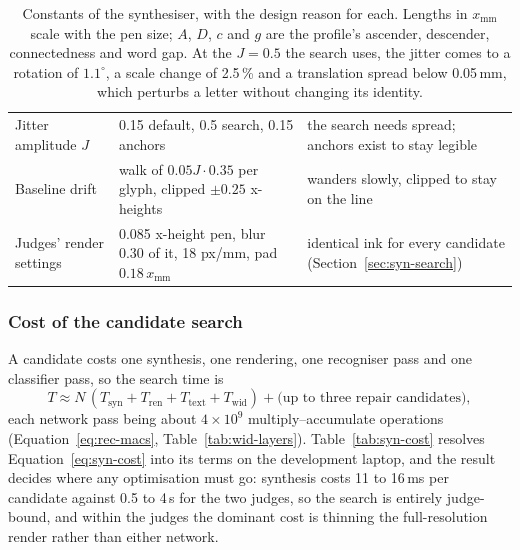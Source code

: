 \begin{table}[!htbp]
\begin{tabularx}{\linewidth}{|p{3.5cm}|p{3.2cm}|X|}
Jitter amplitude $J$ & 0.15 default, 0.5 search, 0.15 anchors & the search needs spread; anchors exist to stay legible \\
Baseline drift & walk of $0.05J\cdot0.35$ per glyph, clipped $\pm0.25$ x-heights & wanders slowly, clipped to stay on the line \\
Judges' render settings & 0.085 x-height pen, blur 0.30 of it, 18 px/mm, pad $0.18\,x_{\mathrm{mm}}$ & identical ink for every candidate (Section~\ref{sec:syn-search}) \\
\hline
\end{tabularx}
\caption{Constants of the synthesiser, with the design reason for each. Lengths in $x_{\mathrm{mm}}$ scale with the pen size; $A$, $D$, $c$ and $g$ are the profile's ascender, descender, connectedness and word gap. At the $J=0.5$ the search uses, the jitter comes to a rotation of $1.1^\circ$, a scale change of 2.5\,\% and a translation spread below 0.05\,mm, which perturbs a letter without changing its identity.}
\label{tab:syn-const}
\end{table}

\subsubsection{Cost of the candidate search}

A candidate costs one synthesis, one rendering, one recogniser pass and one classifier pass, so the search time is
\begin{equation}
T\approx N\,(T_{\mathrm{syn}}+T_{\mathrm{ren}}+T_{\mathrm{text}}+T_{\mathrm{wid}})+\text{(up to three repair candidates)},
\label{eq:syn-cost}
\end{equation}
each network pass being about $4\times10^9$ multiply--accumulate operations (Equation~\ref{eq:rec-macs}, Table~\ref{tab:wid-layers}).
Table~\ref{tab:syn-cost} resolves Equation~\ref{eq:syn-cost} into its terms on the development laptop, and the result decides where any optimisation must go: synthesis costs 11 to 16\,ms per candidate against 0.5 to 4\,s for the two judges, so the search is entirely judge-bound, and within the judges the dominant cost is thinning the full-resolution render rather than either network.

